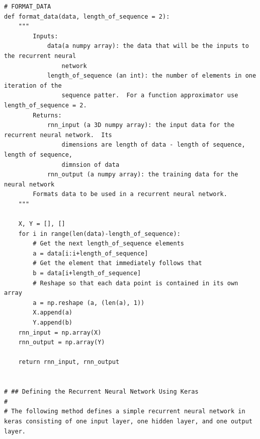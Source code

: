 \documentclass[%
oneside,                 %
final,                   %
10pt]{article}
\begin{document}
\begin{verbatim}
# FORMAT_DATA
def format_data(data, length_of_sequence = 2):  
    """
        Inputs:
            data(a numpy array): the data that will be the inputs to the recurrent neural
                network
            length_of_sequence (an int): the number of elements in one iteration of the
                sequence patter.  For a function approximator use length_of_sequence = 2.
        Returns:
            rnn_input (a 3D numpy array): the input data for the recurrent neural network.  Its
                dimensions are length of data - length of sequence, length of sequence, 
                dimnsion of data
            rnn_output (a numpy array): the training data for the neural network
        Formats data to be used in a recurrent neural network.
    """

    X, Y = [], []
    for i in range(len(data)-length_of_sequence):
        # Get the next length_of_sequence elements
        a = data[i:i+length_of_sequence]
        # Get the element that immediately follows that
        b = data[i+length_of_sequence]
        # Reshape so that each data point is contained in its own array
        a = np.reshape (a, (len(a), 1))
        X.append(a)
        Y.append(b)
    rnn_input = np.array(X)
    rnn_output = np.array(Y)

    return rnn_input, rnn_output


# ## Defining the Recurrent Neural Network Using Keras
# 
# The following method defines a simple recurrent neural network in keras consisting of one input layer, one hidden layer, and one output layer.


\end{verbatim}
\end{document}
